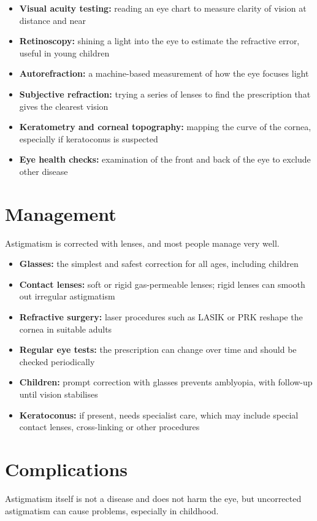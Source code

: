 \begin{itemize}
    \item \textbf{Visual acuity testing:} reading an eye chart to measure clarity of vision at distance and near
    \item \textbf{Retinoscopy:} shining a light into the eye to estimate the refractive error, useful in young children
    \item \textbf{Autorefraction:} a machine-based measurement of how the eye focuses light
    \item \textbf{Subjective refraction:} trying a series of lenses to find the prescription that gives the clearest vision
    \item \textbf{Keratometry and corneal topography:} mapping the curve of the cornea, especially if keratoconus is suspected
    \item \textbf{Eye health checks:} examination of the front and back of the eye to exclude other disease
\end{itemize}

\section*{Management}
Astigmatism is corrected with lenses, and most people manage very well.

\begin{itemize}
    \item \textbf{Glasses:} the simplest and safest correction for all ages, including children
    \item \textbf{Contact lenses:} soft or rigid gas-permeable lenses; rigid lenses can smooth out irregular astigmatism
    \item \textbf{Refractive surgery:} laser procedures such as LASIK or PRK reshape the cornea in suitable adults
    \item \textbf{Regular eye tests:} the prescription can change over time and should be checked periodically
    \item \textbf{Children:} prompt correction with glasses prevents amblyopia, with follow-up until vision stabilises
    \item \textbf{Keratoconus:} if present, needs specialist care, which may include special contact lenses, cross-linking or other procedures
\end{itemize}

\section*{Complications}
Astigmatism itself is not a disease and does not harm the eye, but uncorrected astigmatism can cause problems, especially in childhood.

